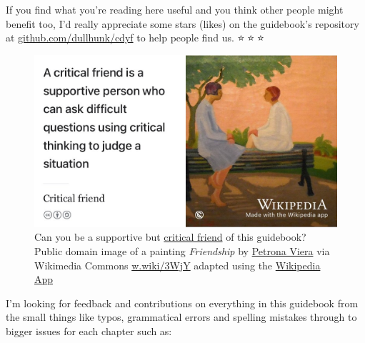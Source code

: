 \documentclass[
]{book}
\begin{document}
If you find what you're reading here useful and you think other people might benefit too, I'd really appreciate some stars (likes) on the guidebook's repository at \href{https://github.com/dullhunk/cdyf}{github.com/dullhunk/cdyf} to help people find us. ⭐️🤩⭐️🤩⭐️

\begin{figure}

{\centering \includegraphics[width=1\linewidth]{images/critical-friend} 

}

\caption{Can you be a supportive but \href{https://en.wikipedia.org/wiki/Critical_friend}{critical friend} of this guidebook? Public domain image of a painting \emph{Friendship} by \href{https://en.wikipedia.org/wiki/Petrona_Viera}{Petrona Viera} via Wikimedia Commons \href{https://w.wiki/3WjY}{w.wiki/3WjY} adapted using the \href{https://apps.apple.com/us/app/wikipedia/id324715238}{Wikipedia App}}\label{fig:critical-friend-fig}
\end{figure}



I'm looking for feedback and contributions on everything in this guidebook from the small things like typos, grammatical errors and spelling mistakes through to bigger issues for each chapter such as:
\end{document}
